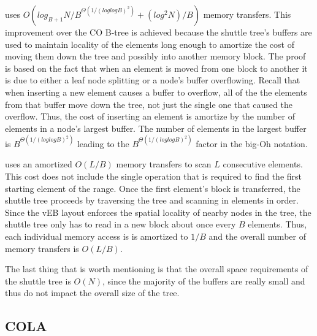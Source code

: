 \documentclass[preprint]{style}
\begin{document}


\Insert{} uses $O(log_{B+1} N / B^{\Theta(1/(loglogB)^2)} + (log^2 N) / B)$
memory transfers. This improvement over the CO B-tree is achieved because the
shuttle tree's buffers are used to maintain locality of the elements long
enough to amortize the cost of moving them down the tree and possibly into
another memory block. The proof is based on the fact that when an element is
moved from one block to another it is due to either a leaf node splitting or a
node's buffer overflowing. Recall that when inserting a new element causes a
buffer to overflow, all of the the elements from that buffer move down the
tree, not just the single one that caused the overflow. Thus, the cost of
inserting an element is amortize by the number of elements in a node's largest
buffer. The number of elements in the largest buffer is
$B^{\Theta(1/(loglogB)^2)}$ leading to the $B^{\Theta(1/(loglogB)^2)}$ factor
in the big-Oh notation.

\Scan{} uses an amortized $O(L/B)$ memory transfers to scan $L$ consecutive
elements. This cost does not include the single \Search{} operation that is
required to find the first starting element of the range. Once the first
element's block is transferred, the shuttle tree proceeds by traversing the
tree and scanning in elements in order. Since the vEB layout enforces the
spatial locality of nearby nodes in the tree, the shuttle tree only has to read
in a new block about once every $B$ elements. Thus, each individual memory
access is is amortized to $1/B$ and the overall number of memory transfers is
$O(L/B)$.

The last thing that is worth mentioning is that the overall space requirements
of the shuttle tree is $O(N)$, since the majority of the buffers are really
small and thus do not impact the overall size of the tree.

\subsection{COLA}
\end{document}
